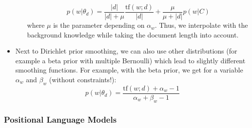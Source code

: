 \begin{itemize}
\begin{itemize}
		$$p(w|\theta_d) = \frac{|d|}{|d|+ \mu}\frac{\text{tf}(w;d)}{|d|} + \frac{\mu}{\mu + |d|}p(w|C)$$
		where $\mu$ is the parameter depending on $\alpha_w$. Thus, we interpolate with the background knowledge while taking the document length into account.
	\end{itemize}
	\item Next to Dirichlet prior smoothing, we can also use other distributions (for example a beta prior with multiple Bernoulli) which lead to slightly different smoothing functions. For example, with the beta prior, we get for a variable $\alpha_w$ and $\beta_w$ (without constraints!):
	$$p(w|\theta_d) = \frac{\text{tf}(w;d) + \alpha_w - 1}{\alpha_w + \beta_w - 1}$$
\end{itemize}
\subsubsection{Positional Language Models}
